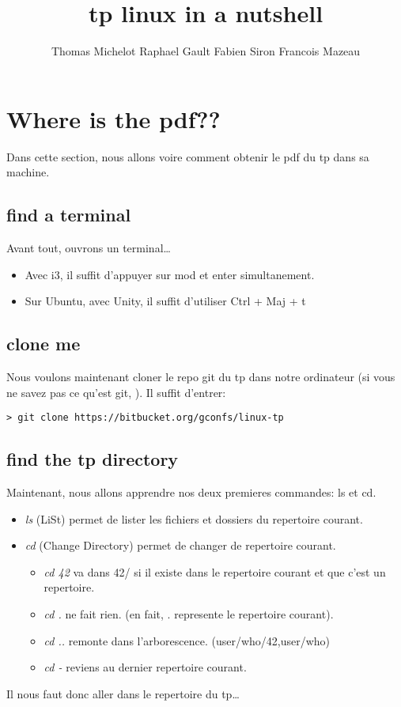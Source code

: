 \documentclass[a4paper]{article}
\title{tp \- linux in a nutshell}
\author{Thomas Michelot \- Raphael Gault \- Fabien Siron \- Francois Mazeau}
\begin{document}
\lstset{language=bash}
\maketitle
\newpage
\tableofcontents
\newpage
\section{Where is the pdf??}
Dans cette section, nous allons voire comment obtenir le pdf du tp dans
sa machine.
\subsection{find a terminal}
Avant tout, ouvrons un terminal\ldots 
\begin{itemize}
  \item Avec i3, il suffit d'appuyer sur mod et enter simultanement.
  \item Sur Ubuntu, avec Unity, il suffit d'utiliser Ctrl + Maj + t  %
\end{itemize}
\subsection{clone me}
Nous voulons maintenant cloner le repo git du tp dans notre ordinateur (si vous
ne savez pas ce qu'est git, %
).
Il suffit d'entrer:
\begin{lstlisting}
> git clone https://bitbucket.org/gconfs/linux-tp
\end{lstlisting}

\subsection{find the tp directory}
Maintenant, nous allons apprendre nos deux premieres commandes: ls et cd.
\begin{itemize}
  \item \emph{ls} (LiSt) permet de lister les fichiers et dossiers du repertoire
    courant.
  \item \emph{cd} (Change Directory) permet de changer de repertoire courant.
    \begin{itemize}
      \item \emph{cd 42} va dans 42/ si il existe dans le repertoire courant et que
        c'est un repertoire.
      \item \emph{cd . } ne fait rien. (en fait, . represente le repertoire
        courant).
      \item \emph{cd ..} remonte dans l'arborescence. (user/who/42,user/who)
      \item \emph{cd -} reviens au dernier repertoire courant.
    \end{itemize}
\end{itemize}
Il nous faut donc aller dans le repertoire du tp\ldots
\end{document}
